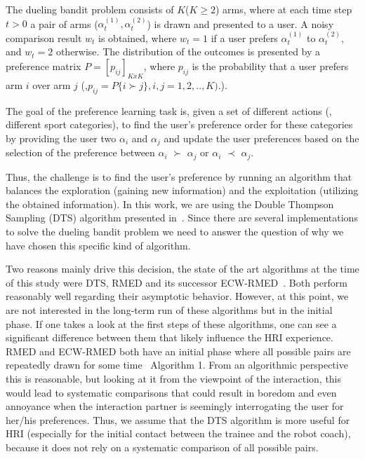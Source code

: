 The dueling bandit problem consists of $K$($K\geq2$) arms, where at each time step $t>0$ a pair of arms ($\alpha_{t}^{(1)},\alpha_{t}^{(2)}$) is drawn and presented to a user. A noisy comparison result $w_{t}$ is obtained, where $w_{t}=1$ if a user prefers $\alpha_{t}^{(1)}$ to $\alpha_{t}^{(2)}$, and $w_{t}=2$ otherwise. The distribution of the outcomes is presented by a preference matrix  $P=[p_{ij}]_{KxK}$, where $p_{ij}$ is the probability that a user prefers arm $i$ over arm $j$ (\eg{},$p_{ij} = P\{i\succ j\}, i,j = 1,2,..,K).$). 

The goal of the preference learning task is, given a set of different actions (\eg{}, different sport categories), to find the user's preference order for these categories by providing the user two $\alpha_{i}$ and $\alpha_{j}$ and update the user preferences based on the selection of the preference between $\alpha_i$ $\succ$ $\alpha_j$ or $\alpha_i$ $\prec$ $\alpha_j$.

Thus, the challenge is to find the user's preference by running an algorithm that balances the exploration (gaining new information) and the exploitation (utilizing the obtained information). In this work, we are using the Double Thompson Sampling (DTS) algorithm presented in~\cite{wu2016double}. 
Since there are several implementations to solve the dueling bandit problem we need to answer the question of why we have chosen this specific kind of algorithm.

Two reasons mainly drive this decision, the state of the art algorithms at the time of this study were DTS, RMED and its successor ECW-RMED~\cite{komiyama2015regret,komiyama2016copeland}. 
Both perform reasonably well regarding their asymptotic behavior. 
However, at this point, we are not interested in the long-term run of these algorithms but in the initial phase. 
If one takes a look at the first steps of these algorithms, one can see a significant difference between them that likely influence the HRI experience. 
RMED and ECW-RMED both have an initial phase where all possible pairs are repeatedly drawn for some time~\cite{komiyama2015regret,komiyama2016copeland} Algorithm 1. 
From an algorithmic perspective this is reasonable, but looking at it from the viewpoint of the interaction, this would lead to systematic comparisons that could result in boredom and even annoyance when the interaction partner is seemingly interrogating the user for her/his preferences. Thus, we assume that the DTS algorithm is more useful for HRI (especially for the initial contact between the trainee and the robot coach), because it does not rely on a systematic comparison of all possible pairs.


